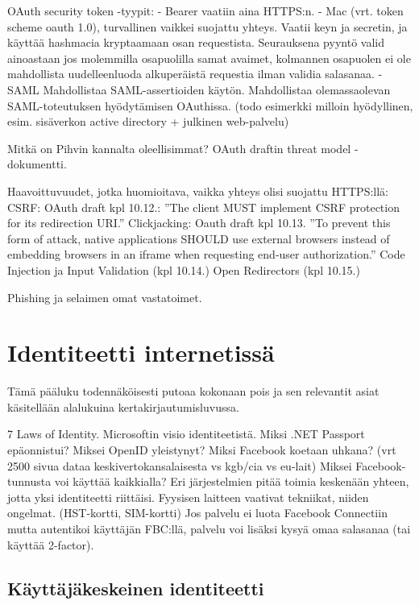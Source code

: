 \documentclass[finnish,gradu]{tktltiki}
\begin{document}
    OAuth security token -tyypit:
    - Bearer vaatiin aina HTTPS:n.
    - Mac (vrt. token scheme oauth 1.0), turvallinen vaikkei suojattu yhteys. Vaatii keyn ja secretin, ja käyttää hashmacia kryptaamaan osan requestista. Seurauksena pyyntö valid ainoastaan jos molemmilla osapuolilla samat avaimet, kolmannen osapuolen ei ole mahdollista uudelleenluoda alkuperäistä requestia ilman validia salasanaa.
    - SAML Mahdollistaa SAML-assertioiden käytön. Mahdollistaa olemassaolevan SAML-toteutuksen hyödytämisen OAuthissa. (todo esimerkki milloin hyödyllinen, esim. sisäverkon active directory + julkinen web-palvelu)

    Mitkä on Pihvin kannalta oleellisimmat?
    OAuth draftin threat model -dokumentti.

    Haavoittuvuudet, jotka huomioitava, vaikka yhteys olisi suojattu HTTPS:llä:
    CSRF: OAuth draft kpl 10.12.: ''The client MUST implement CSRF protection for its redirection URI.''
    Clickjacking: Oauth draft kpl 10.13.
       ''To prevent this form of attack, native applications SHOULD use
       external browsers instead of embedding browsers in an iframe when
       requesting end-user authorization.''
    Code Injection ja Input Validation (kpl 10.14.)
    Open Redirectors (kpl 10.15.)

    Phishing ja selaimen omat vastatoimet.




\section{Identiteetti internetissä} %
\label{sec:identiteetti_internetissä}
  Tämä pääluku todennäköisesti putoaa kokonaan pois ja sen relevantit asiat käsitellään alalukuina kertakirjautumisluvussa.

  7 Laws of Identity.
  Microsoftin visio identiteetistä. Miksi .NET Passport epäonnistui?
  Miksei OpenID yleistynyt?
  Miksi Facebook koetaan uhkana? (vrt 2500 sivua dataa keskivertokansalaisesta vs kgb/cia vs eu-lait)
  Miksei Facebook-tunnusta voi käyttää kaikkialla?
  Eri järjestelmien pitää toimia keskenään yhteen, jotta yksi identiteetti riittäisi.
  Fyysisen laitteen vaativat tekniikat, niiden ongelmat. (HST-kortti, SIM-kortti)
  Jos palvelu ei luota Facebook Connectiin mutta autentikoi käyttäjän FBC:llä, palvelu voi lisäksi kysyä omaa salasanaa (tai käyttää 2-factor).

  \subsection{Käyttäjäkeskeinen identiteetti} %
  \label{sub:käyttäjäkeskeinen_identiteetti}
\end{document}
